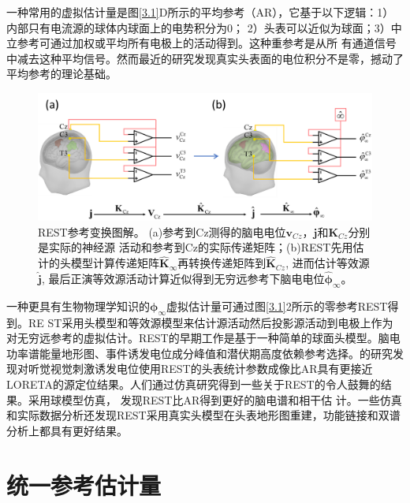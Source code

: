 一种常用的虚拟估计量是图\ref{3.1}D所示的平均参考（AR），它基于以下逻辑：1）内部只有电流源的球体内球面上的电势积分为0； 2）头表可以近似为球面；3）中立参考可通过加权或平均所有电极上的活动得到。这种重参考是从所
有通道信号中减去这种平均信号。然而最近的研究发现真实头表面的电位积分不是零，撼动了平均参考的理论基础。
\begin{figure}[!h]
	\centering
	\includegraphics[width=15cm]{pic/Frontier/figure2.png}
	\caption{REST参考变换图解。 (a)参考到Cz测得的脑电电位$\mathbf{v}_{Cz}$，$\mathbf{j}$和$\mathbf{K}_{Cz}$分别是实际的神经源
	活动和参考到Cz的实际传递矩阵；(b)REST先用估计的头模型计算传递矩阵$\hat{\mathbf{K}}_\infty$再转换传递矩阵到$\hat{\mathbf{K}}_{Cz}$, 进而估计等效源$\hat{\mathbf{j}}$, 最后正演等效源活动计算近似得到无穷远参考下脑电电位$\hat{\mathbf{\phi}}_\infty$。}
	\label{3.2}
\end{figure}
一种更具有生物物理学知识的$\mathbf{\phi}_{\infty}$虚拟估计量可通过图\ref{3.1}2所示的零参考REST得到。RE
ST采用头模型和等效源模型来估计源活动然后投影源活动到电极上作为对无穷远参考的虚拟估计。REST的早期工作是基于一种简单的球面头模型。脑电功率谱能量地形图、事件诱发电位成分峰值和潜伏期高度依赖参考选择。\cite{tian_why_2013}的研究发现对听觉视觉刺激诱发电位使用REST的头表统计参数成像比AR具有更接近LORETA的源定位结果。人们通过仿真研究得到一些关于REST的令人鼓舞的结果。采用球模型仿真，\cite{marzetti_l_use_2007,qin_comparative_2010} 发现REST比AR得到更好的脑电谱和相干估
计。一些仿真和实际数据分析还发现REST采用真实头模型在头表地形图重建，功能链接和双谱分析上都具有更好结果。

\section{统一参考估计量}
